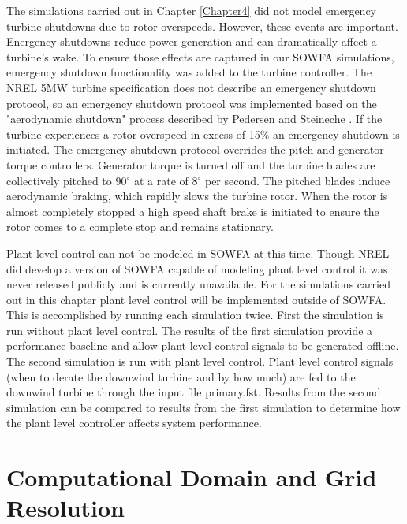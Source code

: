 The simulations carried out in Chapter \ref{Chapter4} did not model emergency turbine shutdowns due to rotor overspeeds. However, these events are important. Energency shutdowns reduce power generation and can dramatically affect a turbine's wake. To ensure those effects are captured in our SOWFA simulations, emergency shutdown functionality was added to the turbine controller. The NREL 5MW turbine specification does not describe an emergency shutdown protocol\cite{jonkman2009}, so an emergency shutdown protocol was implemented based on the "aerodynamic shutdown" process described by Pedersen and Steineche \cite{pedersen2012}. If the turbine experiences a rotor overspeed in excess of 15\% an emergency shutdown is initiated. The emergency shutdown protocol overrides the pitch and generator torque controllers. Generator torque is turned off and the turbine blades are collectively pitched to 90$^{\circ}$ at a rate of 8$^{\circ}$ per second. The pitched blades induce aerodynamic braking, which rapidly slows the turbine rotor. When the rotor is almost completely stopped a high speed shaft brake is initiated to ensure the rotor comes to a complete stop and remains stationary.

Plant level control can not be modeled in SOWFA at this time. Though NREL did develop a version of SOWFA capable of modeling plant level control \cite{fleming2013,fleming2013a} it was never released publicly and is currently unavailable. For the simulations carried out in this chapter plant level control will be implemented outside of SOWFA. This is accomplished by running each simulation twice. First the simulation is run without plant level control. The results of the first simulation provide a performance baseline and allow plant level control signals to be generated offline. The second simulation is run with plant level control. Plant level control signals (when to derate the downwind turbine and by how much) are fed to the downwind turbine through the input file primary.fst. Results from the second simulation can be compared to results from the first simulation to determine how the plant level controller affects system performance. 


\section{Computational Domain and Grid Resolution} \label{section6-3}


